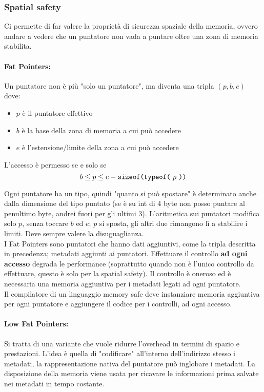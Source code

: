 \subsubsection{Spatial safety}
Ci permette di far valere la proprietà di sicurezza spaziale della memoria, ovvero andare a vedere che un puntatore non vada a puntare oltre una zona di memoria stabilita.\\

\paragraph{Fat Pointers:} Un puntatore non è più "solo un puntatore", ma diventa una tripla $(p,b,e)$ dove: 
\begin{itemize}
	\item $p$ è il puntatore effettivo
	\item $b$ è la base della zona di memoria a cui può accedere
	\item $e$ è l'estensione/limite della zona a cui può accedere
\end{itemize}

L'accesso è permesso se e solo se 
$$b \leq p \leq e - \text{\texttt{sizeof(typeof(} $p$ \text{\texttt{))}}} $$

Ogni puntatore ha un tipo, quindi "quanto si può spostare" è determinato anche dalla dimensione del tipo puntato (se è su int di 4 byte non posso puntare al penultimo byte, andrei fuori per gli ultimi 3). L'aritmetica sui puntatori modifica solo $p$, senza toccare $b$ ed $e$; $p$ si sposta, gli altri due rimangono lì a stabilire i limiti. Deve sempre valere la disuguaglianza.\\

I Fat Pointers sono puntatori che hanno dati aggiuntivi, come la tripla descritta in precedenza; metadati aggiunti ai puntatori.  Effettuare il controllo \textbf{ad ogni accesso} degrada le performance (soprattutto quando non è l'unico controllo da effettuare, questo è solo per la spatial safety). Il controllo è oneroso ed è necessaria una memoria aggiuntiva per i metadati legati ad ogni puntatore.\\
Il compilatore di un linguaggio memory safe deve instanziare memoria aggiuntiva per ogni puntatore e aggiungere il codice per i controlli, ad ogni accesso.\\

\newpage

\paragraph{Low Fat Pointers:} Si tratta di una variante che vuole ridurre l'overhead in termini di spazio e prestazioni. L'idea è quella di "codificare" all'interno dell'indirizzo stesso i metadati, la rappresentazione nativa del puntatore può inglobare i metadati. La disposizione della memoria viene usata per ricavare le informazioni prima salvate nei metadati in tempo costante.\\

